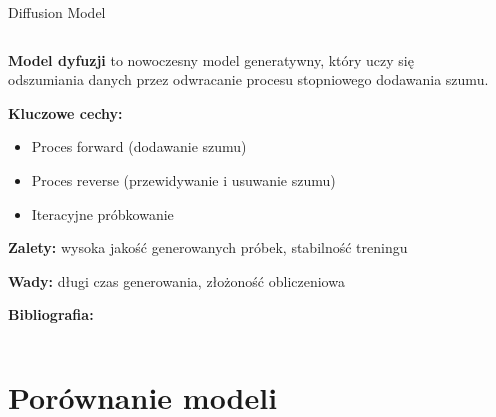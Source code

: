 \documentclass{beamer}
\begin{document}
\begin{frame}{Diffusion Model}
  \begin{columns}
    \begin{column}{0.6\textwidth}
      \textbf{Model dyfuzji} to nowoczesny model generatywny, który uczy się odszumiania danych przez odwracanie procesu stopniowego dodawania szumu.
      
      \medskip
      \textbf{Kluczowe cechy:}
      \begin{itemize}
        \item Proces forward (dodawanie szumu)
        \item Proces reverse (przewidywanie i usuwanie szumu)
        \item Iteracyjne próbkowanie
      \end{itemize}
      
      \textbf{Zalety:} wysoka jakość generowanych próbek, stabilność treningu
      
      \textbf{Wady:} długi czas generowania, złożoność obliczeniowa
      
      \textbf{Bibliografia:} \cite{ho2020denoising}
    \end{column}
    \begin{column}{0.4\textwidth}
    \end{column}
  \end{columns}
\end{frame}


\section{Porównanie modeli}
\end{document}
